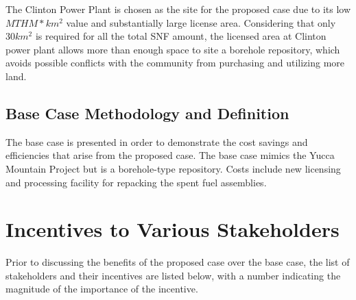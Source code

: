 \documentclass{anstrans}
\begin{document}
The Clinton Power Plant is chosen as the site for the proposed case due to its
low $MTHM*km^2$ value and substantially large license area. Considering that only
 $30km^2$ is required for all the total \gls{SNF} amount, the licensed area at Clinton power plant allows more than  enough space to site a borehole repository, which avoids
  possible conflicts with the community from purchasing and utilizing more land.
  
\subsection{Base Case Methodology and Definition}
The base case is presented in order to demonstrate the cost savings and efficiencies 
that arise from the proposed case. The base case mimics the Yucca Mountain Project
but is a borehole-type repository. Costs include new licensing and processing facility
 for repacking the spent fuel assemblies.


\section {Incentives to Various Stakeholders}

Prior to discussing the benefits of the proposed case over the base case, the list of
 stakeholders and their incentives are listed below, with a number indicating the 
 magnitude of the importance of the incentive.
 
 
\begin{table}[h]

\centering
\caption {Incentive Criterion and Weight for Each Stakeholder}
\end{table}
\end{document}
